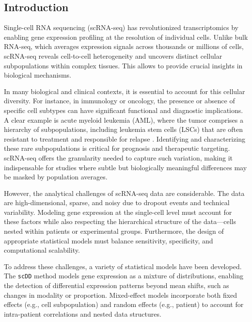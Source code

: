 \documentclass[a4paper, 11pt, twocolumn]{article}
\begin{document}
\begin{multicols}{2}
\section{Introduction}

Single-cell RNA sequencing (scRNA-seq) has revolutionized transcriptomics by enabling gene expression profiling at the resolution of individual cells. Unlike bulk RNA-seq, which averages expression signals across thousands or millions of cells, scRNA-seq reveals cell-to-cell heterogeneity and uncovers distinct cellular subpopulations within complex tissues. This allows to provide crucial insights in biological mechanisms.

In many biological and clinical contexts, it is essential to account for this cellular diversity. For instance, in immunology or oncology, the presence or absence of specific cell subtypes can have significant functional and diagnostic implications. A clear example is acute myeloid leukemia (AML), where the tumor comprises a hierarchy of subpopulations, including leukemia stem cells (LSCs) that are often resistant to treatment and responsible for relapse \citep{van2019single}. Identifying and characterizing these rare subpopulations is critical for prognosis and therapeutic targeting. scRNA-seq offers the granularity needed to capture such variation, making it indispensable for studies where subtle but biologically meaningful differences may be masked by population averages.

However, the analytical challenges of scRNA-seq data are considerable. The data are high-dimensional, sparse, and noisy due to dropout events and technical variability. Modeling gene expression at the single-cell level must account for these factors while also respecting the hierarchical structure of the data—cells nested within patients or experimental groups. Furthermore, the design of appropriate statistical models must balance sensitivity, specificity, and computational scalability.

To address these challenges, a variety of statistical models have been developed. The \texttt{scDD} method \citep{scdd} models gene expression as a mixture of distributions, enabling the detection of differential expression patterns beyond mean shifts, such as changes in modality or proportion. Mixed-effect models  incorporate both fixed effects (e.g., cell subpopulation) and random effects (e.g., patient) to account for intra-patient correlations and nested data structures.


\end{multicols}
\end{document}

